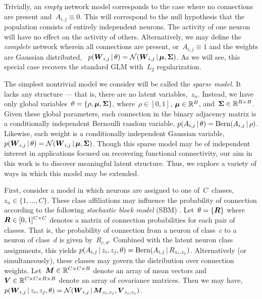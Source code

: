 Trivially, an \emph{empty} network model corresponds to the case where no connections are present and~${A_{i,j} \equiv 0}$. 
This will correspond to the null hypothesis that the population consists of entirely independent neurons. 
The activity of one neuron will have no effect on the activity of others. 
Alternatively, we may define the \emph{complete} network wherein all connections are present, or~${A_{i,j} \equiv 1}$ and the weights are Gaussian distributed,
~${p(\boldsymbol{W}_{i,j} \,|\, \theta) = \mathcal{N}(\boldsymbol{W}_{i,j} \,|\, \boldsymbol{\mu}, \boldsymbol{\Sigma})}$. 
As we will see, this special case recovers the standard GLM with~$L_2$ regularization. 

The simplest nontrivial model we consider will be called the \emph{sparse model}.
It lacks any structure --- that is, there are no latent variables,~$z_n$. 
Instead, we have only global variables~$\theta = \{\rho, \boldsymbol{\mu}, \boldsymbol{\Sigma} \}$, where~${\rho \in [0,1]}$, ${\boldsymbol{\mu} \in \mathbb{R}^B}$, and~${\boldsymbol{\Sigma} \in \mathbb{R}^{B \times B}}$. 
Given these global parameters, each connection in the binary adjacency matrix is a conditionally independent Bernoulli random variable,
${p(A_{i,j} \,|\, \theta) = \mathrm{Bern}(A_{i,j} \,|\, \rho)}$.
Likewise, each weight is a conditionally independent Gaussian variable,
${p(\boldsymbol{W}_{i,j} \,|\, \theta) = \mathcal{N}(\boldsymbol{W}_{i,j} \,|\, \boldsymbol{\mu}, \boldsymbol{\Sigma})}$.
Though this sparse model may be of independent interest in applications focused on recovering functional connectivity, our aim in this work is to discover meaningful latent structure. 
Thus, we explore a variety of ways in which this model may be extended.

First, consider a model in which neurons are assigned to one of~$C$~classes,~$z_n \in \{1, \ldots, C\}$. 
These class affiliations may influence the probability of connection according to the following \emph{stochastic block model} (SBM) \cite{Nowicki-2001}. 
Let~$\theta = \{\boldsymbol{R}\}$ where~${\boldsymbol{R} \in [0,1]^{C \times C}}$ denotes a matrix of connection probabilities for each pair of classes. 
That is, the probability of connection from a neuron of class~$c$ to a neuron of class~$d$ is given by~$R_{c,d}$.
Combined with the latent neuron class assignments, this yields
${p(A_{i,j} \,|\, z_i, z_j, \theta) = \mathrm{Bern}(A_{i,j} \,|\, R_{z_i, z_j})}$.
Alternatively (or simultaneously), these classes may govern the distribution over connection weights. 
Let~${\boldsymbol{M} \in \mathbb{R}^{C \times C \times B}}$ denote an array of mean vectors and~
${\boldsymbol{V} \in \mathbb{R}^{C \times C \times B \times B}}$ denote an array of covariance matrices. 
Then we may have,
${p(\boldsymbol{W}_{i,j} \,|\, z_i, z_j, \theta) = \mathcal{N}(\boldsymbol{W}_{i,j} \,|\, \boldsymbol{M}_{z_i, z_j}, \boldsymbol{V}_{z_i,z_j})}$.

